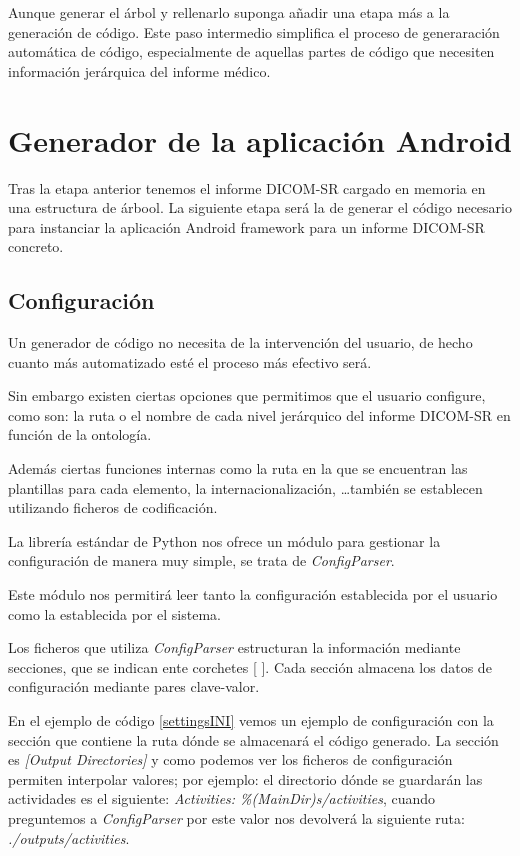 Aunque generar el árbol y rellenarlo suponga añadir una etapa más a la generación de código. Este paso intermedio simplifica el proceso de generaración automática de código, especialmente de aquellas partes de código que necesiten información jerárquica del informe médico.\par

\section{Generador de la aplicación Android}\label{sec:generacion}
Tras la etapa anterior tenemos el informe DICOM-SR cargado en memoria en una estructura de árbool. La siguiente etapa será la de generar el código necesario para instanciar la aplicación Android framework para un informe DICOM-SR concreto.\par

\subsection{Configuración}\label{sec:configuracion}
Un generador de código no necesita de la intervención del usuario, de hecho cuanto más automatizado esté el proceso más efectivo será.\par
Sin embargo existen ciertas opciones que permitimos que el usuario configure, como son: la ruta o el nombre de cada nivel jerárquico del informe DICOM-SR en función de la ontología. \par
Además ciertas funciones internas como la ruta en la que se encuentran las plantillas para cada elemento, la internacionalización, \ldots también se establecen utilizando ficheros de codificación.\medskip\par
La librería estándar de Python nos ofrece un módulo para gestionar la configuración de manera muy simple, se trata de \emph{ConfigParser}.\par
Este módulo nos permitirá leer tanto la configuración establecida por el  usuario como la establecida por el sistema.\par
Los ficheros que utiliza \emph{ConfigParser} estructuran la información mediante secciones, que se indican ente corchetes [ ]. Cada sección almacena los datos de configuración mediante pares clave-valor.\par
En el ejemplo de código \ref{settingsINI} vemos un ejemplo de configuración con la sección que contiene la ruta dónde se almacenará el código generado. La sección es \emph{[Output Directories]} y como podemos ver los ficheros de configuración permiten interpolar valores; por ejemplo: el directorio dónde se guardarán las actividades es el siguiente: \emph{Activities: \%(MainDir)s/activities}, cuando preguntemos a \emph{ConfigParser} por este valor nos devolverá la siguiente ruta: \emph{./outputs/activities}.\par

